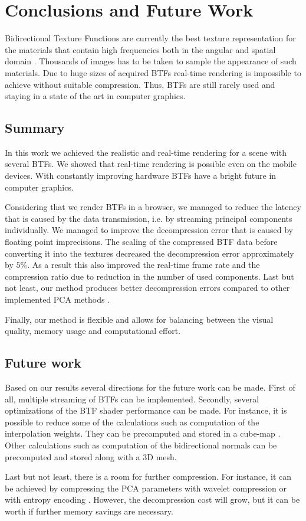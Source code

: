 \chapter{Conclusions and Future Work}
\label{chapter:conclusions}
 Bidirectional Texture Functions are currently the best texture representation for the materials 
 that contain high frequencies both in the angular and spatial domain \cite{mueller-2003-compression}.
 Thousands of images has to be taken to sample the appearance of such materials.
 Due to huge sizes of acquired BTFs real-time rendering is impossible to achieve without suitable compression.
 Thus, BTFs are still rarely used and staying in a state of the art in computer graphics. 

\section{Summary}

 In this work we achieved the realistic and real-time rendering for a scene with several BTFs.
We showed that real-time rendering is possible even on the mobile devices.
With constantly improving hardware BTFs have a bright future in computer graphics.

 Considering that we render BTFs in a browser, we managed to reduce the latency that is caused by the data transmission, i.e.
 by streaming  principal components individually.
 We managed to improve the decompression error that is caused by floating point imprecisions.
 The scaling of the compressed BTF data before converting it into the textures decreased the decompression error approximately by $5\%$.
 As a result this also improved the real-time frame rate and the compression ratio due to reduction in the number of used components.
 Last but not least, our method produces better decompression errors compared to other implemented PCA methods \cite{haindl}.


Finally, our method is flexible and allows for balancing between the visual quality, memory usage and computational effort.
\section{Future work}
\label{section:future_work}

Based on our results several directions for the future work can be made.
First of all, multiple streaming of BTFs can be implemented.
Secondly, several optimizations of the BTF shader performance can be made.
For instance, it is possible to reduce some of the calculations such as computation of the interpolation weights. 
They can be precomputed and stored in a cube-map \cite{haindl}.
Other calculations such as computation of the bidirectional normals can be precomputed and stored along with a 3D mesh.

Last but not least, there is a room for further compression.
 For instance, it can be achieved by compressing the PCA parameters with wavelet compression \cite{webglbtfstreaming} or with entropy encoding \cite{gpu_gems}. 
However, the decompression cost will grow, but it can be worth if further memory savings are necessary. 